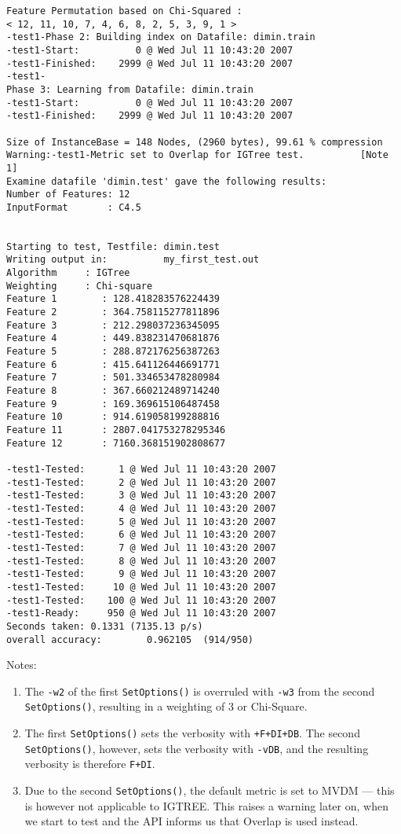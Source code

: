 \documentclass{report}
\begin{document}
\begin{footnotesize}
\begin{verbatim}
Feature Permutation based on Chi-Squared :
< 12, 11, 10, 7, 4, 6, 8, 2, 5, 3, 9, 1 >
-test1-Phase 2: Building index on Datafile: dimin.train
-test1-Start:          0 @ Wed Jul 11 10:43:20 2007
-test1-Finished:    2999 @ Wed Jul 11 10:43:20 2007
-test1-
Phase 3: Learning from Datafile: dimin.train
-test1-Start:          0 @ Wed Jul 11 10:43:20 2007
-test1-Finished:    2999 @ Wed Jul 11 10:43:20 2007

Size of InstanceBase = 148 Nodes, (2960 bytes), 99.61 % compression
Warning:-test1-Metric set to Overlap for IGTree test.          [Note 1]
Examine datafile 'dimin.test' gave the following results:
Number of Features: 12
InputFormat       : C4.5


Starting to test, Testfile: dimin.test
Writing output in:          my_first_test.out
Algorithm     : IGTree
Weighting     : Chi-square
Feature 1        : 128.418283576224439
Feature 2        : 364.758115277811896
Feature 3        : 212.298037236345095
Feature 4        : 449.838231470681876
Feature 5        : 288.872176256387263
Feature 6        : 415.641126446691771
Feature 7        : 501.334653478280984
Feature 8        : 367.660212489714240
Feature 9        : 169.369615106487458
Feature 10       : 914.619058199288816
Feature 11       : 2807.041753278295346
Feature 12       : 7160.368151902808677

-test1-Tested:      1 @ Wed Jul 11 10:43:20 2007
-test1-Tested:      2 @ Wed Jul 11 10:43:20 2007
-test1-Tested:      3 @ Wed Jul 11 10:43:20 2007
-test1-Tested:      4 @ Wed Jul 11 10:43:20 2007
-test1-Tested:      5 @ Wed Jul 11 10:43:20 2007
-test1-Tested:      6 @ Wed Jul 11 10:43:20 2007
-test1-Tested:      7 @ Wed Jul 11 10:43:20 2007
-test1-Tested:      8 @ Wed Jul 11 10:43:20 2007
-test1-Tested:      9 @ Wed Jul 11 10:43:20 2007
-test1-Tested:     10 @ Wed Jul 11 10:43:20 2007
-test1-Tested:    100 @ Wed Jul 11 10:43:20 2007
-test1-Ready:     950 @ Wed Jul 11 10:43:20 2007
Seconds taken: 0.1331 (7135.13 p/s)
overall accuracy:        0.962105  (914/950)
\end{verbatim}
\end{footnotesize}


Notes:
\begin{enumerate}
\item The {\tt -w2} of the first {\tt SetOptions()} is overruled with
  {\tt -w3} from the second {\tt SetOptions()}, resulting in a
  weighting of 3 or Chi-Square. 
\item The first {\tt SetOptions()} sets the verbosity with {\tt +F+DI+DB}.
The second {\tt SetOptions()}, however, sets the verbosity with {\tt -vDB}, and the
resulting verbosity is therefore {\tt F+DI}.
\item Due to the second {\tt SetOptions()}, the default metric is set to
MVDM --- this is however not applicable to IGTREE. This raises a warning
later on, when we start to test and the API informs us that Overlap is
used instead.
\end{enumerate}
\end{document}
